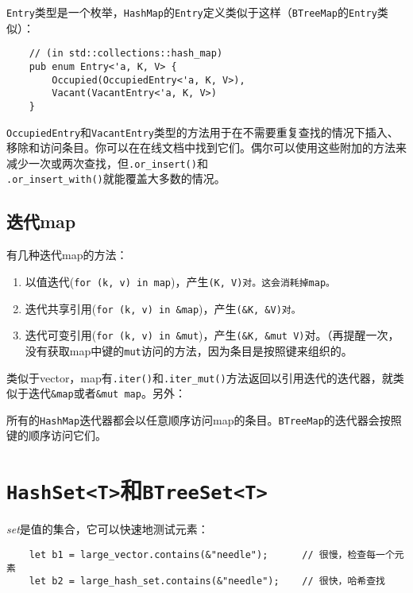 \texttt{Entry}类型是一个枚举，\texttt{HashMap}的\texttt{Entry}定义类似于这样（\texttt{BTreeMap}的\texttt{Entry}类似）：
\begin{verbatim}
    // (in std::collections::hash_map)
    pub enum Entry<'a, K, V> {
        Occupied(OccupiedEntry<'a, K, V>),
        Vacant(VacantEntry<'a, K, V>)
    }
\end{verbatim}

\texttt{OccupiedEntry}和\texttt{VacantEntry}类型的方法用于在不需要重复查找的情况下插入、移除和访问条目。你可以在在线文档中找到它们。偶尔可以使用这些附加的方法来减少一次或两次查找，但\texttt{.or\_insert()}和\\
\texttt{.or\_insert\_with()}就能覆盖大多数的情况。

\subsection{迭代map}
有几种迭代map的方法：
\begin{enumerate}
    \item 以值迭代(\texttt{for (k, v) in map})，产生\texttt{(K, V)对。这会消耗掉map。}
    \item 迭代共享引用(\texttt{for (k, v) in \&map})，产生\texttt{(\&K, \&V)对。}
    \item 迭代可变引用(\texttt{for (k, v) in \&mut})，产生\texttt{(\&K, \&mut V)}对。（再提醒一次，没有获取map中键的\texttt{mut}访问的方法，因为条目是按照键来组织的。
\end{enumerate}

类似于vector，map有\texttt{.iter()}和\texttt{.iter\_mut()}方法返回以引用迭代的迭代器，就类似于迭代\texttt{\&map}或者\texttt{\&mut map}。另外：




所有的\texttt{HashMap}迭代器都会以任意顺序访问map的条目。\texttt{BTreeMap}的迭代器会按照键的顺序访问它们。

\section{\texttt{HashSet<T>}和\texttt{BTreeSet<T>}}\label{set}

\emph{set}是值的集合，它可以快速地测试元素：
\begin{verbatim}
    let b1 = large_vector.contains(&"needle");      // 很慢，检查每一个元素
    let b2 = large_hash_set.contains(&"needle");    // 很快，哈希查找
\end{verbatim}

